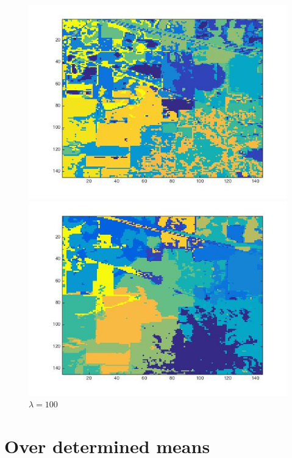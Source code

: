 \documentclass[11pt]{article}
\begin{document}
\begin{figure}[h!]
\begin{minipage}{.5\textwidth}
  \includegraphics[scale=0.45]{plain_km_lambda50.jpg}
  \caption{$\lambda = 50$}
  \label{fig:3}
\end{minipage}%
\begin{minipage}{.5\textwidth}
  \includegraphics[scale=0.45]{plain_km_lambda100.jpg}
  \caption{$\lambda = 100$}
  \label{fig:3}
\end{minipage}
\end{figure}







\section*{Over determined means}
\end{document}
